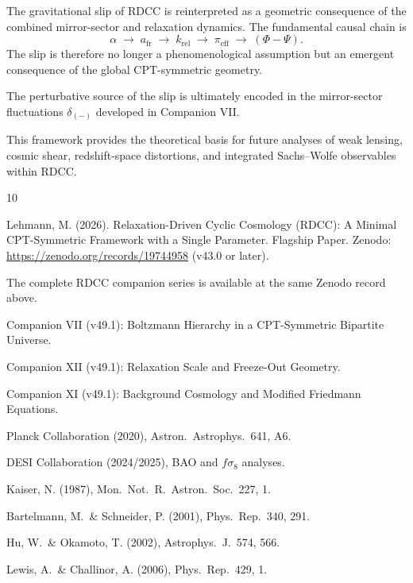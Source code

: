 \documentclass[11pt,a4paper]{article}
\begin{document}
The gravitational slip of RDCC is reinterpreted as a geometric consequence of
the combined mirror-sector and relaxation dynamics. The fundamental causal
chain is
\begin{equation}
  \alpha
  \;\rightarrow\;
  a_{\mathrm{fr}}
  \;\rightarrow\;
  k_{\mathrm{rel}}
  \;\rightarrow\;
  \pi_{\mathrm{eff}}
  \;\rightarrow\;
  (\Phi-\Psi).
\end{equation}
The slip is therefore no longer a phenomenological assumption but an emergent
consequence of the global CPT-symmetric geometry.

The perturbative source of the slip is ultimately encoded in the mirror-sector
fluctuations \(\delta_{(-)}\) developed in Companion VII.

This framework provides the theoretical basis for future analyses of weak
lensing, cosmic shear, redshift-space distortions, and integrated Sachs--Wolfe
observables within RDCC.

\begin{thebibliography}{10}

 Lehmann, M. (2026). Relaxation-Driven Cyclic Cosmology
(RDCC): A Minimal CPT-Symmetric Framework with a Single Parameter. Flagship
Paper. Zenodo: \url{https://zenodo.org/records/19744958} (v43.0 or later).

 The complete RDCC companion series is available at the same
Zenodo record above.

 Companion VII (v49.1): Boltzmann Hierarchy in a CPT-Symmetric
Bipartite Universe.

 Companion XII (v49.1): Relaxation Scale and Freeze-Out
Geometry.

 Companion XI (v49.1): Background Cosmology and Modified
Friedmann Equations.

 Planck Collaboration (2020), Astron.\ Astrophys.\ 641, A6.

 DESI Collaboration (2024/2025), BAO and \(f\sigma_8\) analyses.

 Kaiser, N. (1987), Mon.\ Not.\ R.\ Astron.\ Soc.\ 227, 1.

 Bartelmann, M.\ \& Schneider, P. (2001), Phys.\ Rep.\
340, 291.

 Hu, W.\ \& Okamoto, T. (2002), Astrophys.\ J.\ 574, 566.

 Lewis, A.\ \& Challinor, A. (2006), Phys.\ Rep.\
429, 1.

\end{thebibliography}
\end{document}
